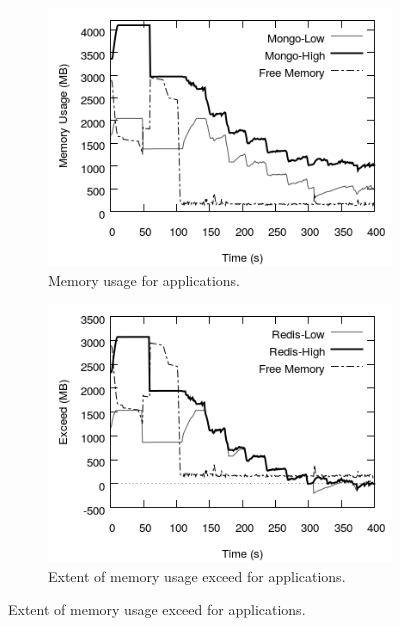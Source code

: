       \begin{figure}
	      \begin{subfigure}{0.48\textwidth}
		\includegraphics[width=\textwidth]{images/controller_issues/derivative_issues/memory_usage_redis.png}
		\caption{\footnotesize Memory usage for \redis{} applications.}
		\label{plot_inference_redis}
	      \end{subfigure}
	      \begin{subfigure}{0.48\textwidth}
		\includegraphics[width=\textwidth]{images/controller_issues/derivative_issues/exceed_redis.png}
		\caption{\footnotesize Extent of memory usage exceed for \redis{} applications.}

\end{subfigure}
\end{figure}
